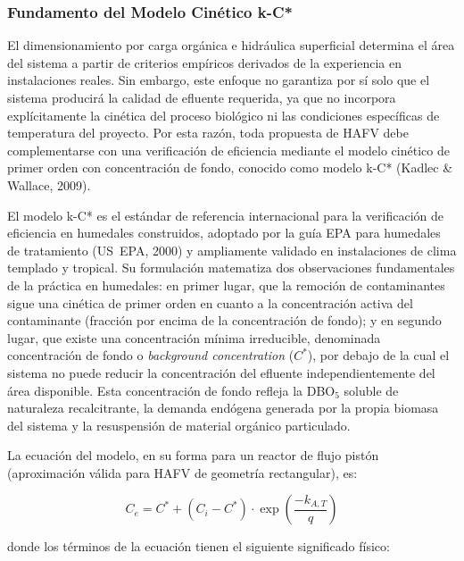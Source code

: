 \documentclass[12pt,a4paper]{article}
\begin{document}
\subsubsection*{Fundamento del Modelo Cinético k-C*}

El dimensionamiento por carga orgánica e hidráulica superficial determina el área del sistema a partir de criterios empíricos derivados de la experiencia en instalaciones reales. Sin embargo, este enfoque no garantiza por sí solo que el sistema producirá la calidad de efluente requerida, ya que no incorpora explícitamente la cinética del proceso biológico ni las condiciones específicas de temperatura del proyecto. Por esta razón, toda propuesta de HAFV debe complementarse con una verificación de eficiencia mediante el modelo cinético de primer orden con concentración de fondo, conocido como modelo k-C* (Kadlec \& Wallace, 2009).

El modelo k-C* es el estándar de referencia internacional para la verificación de eficiencia en humedales construidos, adoptado por la guía EPA para humedales de tratamiento (US~EPA, 2000) y ampliamente validado en instalaciones de clima templado y tropical. Su formulación matematiza dos observaciones fundamentales de la práctica en humedales: en primer lugar, que la remoción de contaminantes sigue una cinética de primer orden en cuanto a la concentración activa del contaminante (fracción por encima de la concentración de fondo); y en segundo lugar, que existe una concentración mínima irreducible, denominada concentración de fondo o \textit{background concentration} ($C^*$), por debajo de la cual el sistema no puede reducir la concentración del efluente independientemente del área disponible. Esta concentración de fondo refleja la DBO$_5$ soluble de naturaleza recalcitrante, la demanda endógena generada por la propia biomasa del sistema y la resuspensión de material orgánico particulado.

La ecuación del modelo, en su forma para un reactor de flujo pistón (aproximación válida para HAFV de geometría rectangular), es:

\begin{equation}
C_e = C^* + (C_i - C^*) \cdot \exp\!\left(\frac{-k_{A,T}}{q}\right)
\label{eq:kC_star}
\end{equation}

donde los términos de la ecuación tienen el siguiente significado físico:
\end{document}
